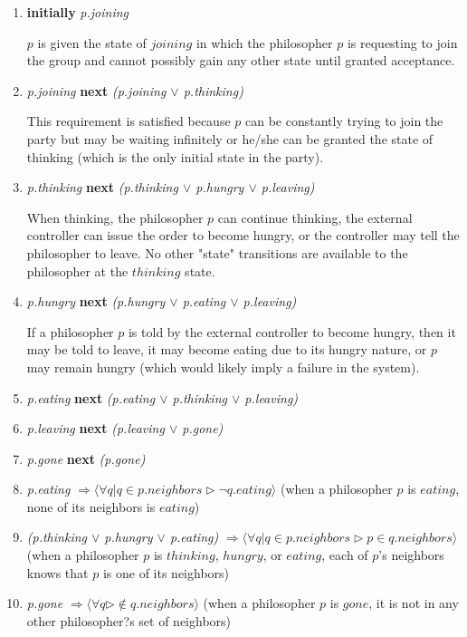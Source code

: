 \documentclass[11pt]{article}
\begin{document}
\begin{enumerate}[S1]
\item {\bfseries initially} {\it p.joining}

$p$ is given the state of $joining$ in which the philosopher $p$ is requesting to join the group and cannot possibly gain any other state until granted acceptance.

\item {\it p.joining} {\bfseries next} {\it (p.joining $\vee$ p.thinking)}

This requirement is satisfied because $p$ can be constantly trying to join the party but may be waiting infinitely or he/she can be granted the state of thinking (which is the only initial state in the party).

\item {\it p.thinking} {\bfseries next} {\it (p.thinking $\vee$ p.hungry $\vee$ p.leaving)}

When thinking, the philosopher $p$ can continue thinking, the external controller can issue the order to become hungry, or the controller may tell the philosopher to leave. No other "state" transitions are available to the philosopher at the $thinking$ state. 

\item {\it p.hungry} {\bfseries next} {\it (p.hungry $\vee$ p.eating $\vee$ p.leaving)}

If a philosopher $p$ is told by the external controller to become hungry, then it may be told to leave, it may become eating due to its hungry nature, or $p$ may remain hungry (which would likely imply a failure in the system).

\item {\it p.eating} {\bfseries next} {\it (p.eating $\vee$ p.thinking $\vee$ p.leaving)}


\item {\it p.leaving} {\bfseries next} {\it (p.leaving $\vee$ p.gone)}



\item {\it p.gone} {\bfseries next} {\it (p.gone)}



\item {\it p.eating} $\Rightarrow \langle \forall q | q \in p.neighbors \rhd \neg q.eating \rangle$
(when a philosopher $p$ is $eating$, none of its neighbors is $eating$)



\item {\it (p.thinking $\vee$ p.hungry $\vee$ p.eating)} $\Rightarrow \langle \forall q | q \in p.neighbors \rhd p \in q.neighbors \rangle$
(when a philosopher $p$ is $thinking$, $hungry$, or $eating$, each of $p$'s neighbors knows that $p$ is one of its neighbors)


\item {\it p.gone} $\Rightarrow \langle \forall q  \rhd \not\in q.neighbors \rangle$
(when a philosopher $p$ is $gone$, it is not in any other philosopher?s set of neighbors)

\end{enumerate}
\end{document}
